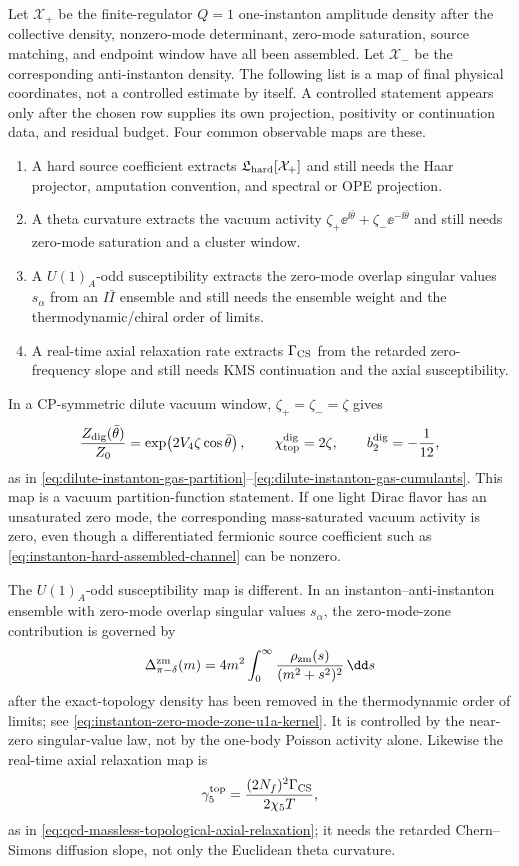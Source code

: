 \begin{remark}
\label{rem:instanton-observable-handoff-map}
Let \(\mathcal X_{+}\) be the finite-regulator \(Q=1\) one-instanton
amplitude density after the collective density, nonzero-mode determinant,
zero-mode saturation, source matching, and endpoint window have all been
assembled.  Let \(\mathcal X_{-}\) be the corresponding anti-instanton
density.  The following list is a map of final physical coordinates, not a
controlled estimate by itself.  A controlled statement appears only after the
chosen row supplies its own projection, positivity or continuation data, and
residual budget.  Four common observable maps are these.
\begin{enumerate}[label=(\roman*)]
\item A hard source coefficient extracts
\(\mathfrak L_{\rm hard}[\mathcal X_+]\) and still needs the Haar projector,
amputation convention, and spectral or OPE projection.
\item A theta curvature extracts the vacuum activity
\(\zeta_+\ee^{\ii\bar\theta}+\zeta_-\ee^{-\ii\bar\theta}\) and still needs
zero-mode saturation and a cluster window.
\item A \(U(1)_A\)-odd susceptibility extracts the zero-mode overlap singular
values \(s_\alpha\) from an \(I\bar I\) ensemble and still needs the ensemble
weight and the thermodynamic/chiral order of limits.
\item A real-time axial relaxation rate extracts \(\Gamma_{\rm CS}\) from the
retarded zero-frequency slope and still needs KMS continuation and the axial
susceptibility.
\end{enumerate}
In a CP-symmetric dilute vacuum window, \(\zeta_+=\zeta_-=\zeta\) gives
\[
  \frac{Z_{\rm dig}(\bar\theta)}{Z_0}
  =
  \exp\!\left(2V_4\zeta\cos\bar\theta\right),
  \qquad
  \chi_{\rm top}^{\rm dig}=2\zeta,
  \qquad
  b_2^{\rm dig}=-\frac1{12},
\]
as in
\eqref{eq:dilute-instanton-gas-partition}--\eqref{eq:dilute-instanton-gas-cumulants}.
This map is a vacuum partition-function statement.  If one light Dirac
flavor has an unsaturated zero mode, the corresponding mass-saturated vacuum
activity is zero, even though a differentiated fermionic source coefficient
such as \eqref{eq:instanton-hard-assembled-channel} can be nonzero.

The \(U(1)_A\)-odd susceptibility map is different.  In an
instanton--anti-instanton ensemble with zero-mode overlap singular values
\(s_\alpha\), the zero-mode-zone contribution is governed by
\[
  \Delta_{\pi-\delta}^{\rm zm}(m)
  =
  4m^2\int_0^\infty
  \frac{\rho_{\rm zm}(s)}{(m^2+s^2)^2}\,\dd s
\]
after the exact-topology density has been removed in the thermodynamic
order of limits; see
\eqref{eq:instanton-zero-mode-zone-u1a-kernel}.  It is controlled by the
near-zero singular-value law, not by the one-body Poisson activity alone.
Likewise the real-time axial relaxation map is
\[
  \gamma_5^{\rm top}
  =
  \frac{(2N_f)^2\Gamma_{\rm CS}}{2\chi_5T},
\]
as in \eqref{eq:qcd-massless-topological-axial-relaxation}; it needs the
retarded Chern--Simons diffusion slope, not only the Euclidean theta
curvature.


\end{remark}
